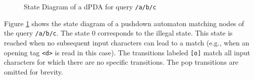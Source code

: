 \begin{figure}
    \small
\centering
{}
\caption{State Diagram of a dPDA for query \texttt{/a/b/c}}
\label{fig:exampleFSA}
\end{figure}

Figure \ref{fig:exampleFSA} shows the state diagram of a pushdown automaton
matching nodes of the query \verb;/a/b/c;. The state $0$ corresponds
to the illegal state. This state is reached when no subsequent input characters
can lead to a match (e.g., when an opening tag \verb;<d>; is read in this
case). The transitions labeled \verb;[o]; match all input characters for which
there are no specific transitions. The pop transitions are omitted for brevity.





